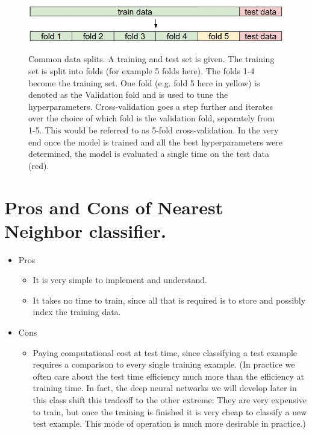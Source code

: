 \begin{figure}
  \centering
  \includegraphics[width=5 in]{pic/crossval}\\
  \caption{Common data splits. A training and test set is given. The training set is split into folds (for example 5 folds here). The folds 1-4 become the training set. One fold (e.g. fold 5 here in yellow) is denoted as the Validation fold and is used to tune the hyperparameters. Cross-validation goes a step further and iterates over the choice of which fold is the validation fold, separately from 1-5. This would be referred to as 5-fold cross-validation. In the very end once the model is trained and all the best hyperparameters were determined, the model is evaluated a single time on the test data (red).}
\end{figure}

\section{Pros and Cons of Nearest Neighbor classifier.}
\begin{itemize}
  \item Pros
      \begin{itemize}
        \item It is very simple to implement and understand. 
        \item It takes no time to train, since all that is required is to store and possibly index the training data.
      \end{itemize}
  \item Cons
    \begin{itemize}
      \item Paying computational cost at test time, since classifying a test example requires a comparison to every single training example. (In practice we often care about the test time efficiency much more than the efficiency at training time. In fact, the deep neural networks we will develop later in this class shift this tradeoff to the other extreme: They are very expensive to train, but once the training is finished it is very cheap to classify a new test example. This mode of operation is much more desirable in practice.)
    \end{itemize}
\end{itemize}

